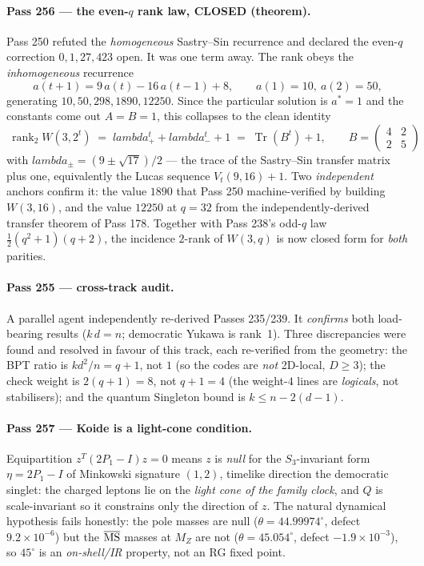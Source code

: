\documentclass[12pt,a4paper]{article}
\def\mathbf#1{#1}%
\def\lambda{lambda}%
\theoremstyle{definition}
\begin{document}
\paragraph{Pass 256 --- the even-$q$ rank law, CLOSED (theorem).} Pass 250
refuted the \emph{homogeneous} Sastry--Sin recurrence and declared the even-$q$
correction $0,1,27,423$ open. It was one term away. The rank obeys the
\emph{inhomogeneous} recurrence
\[
   a(t+1) = 9\,a(t) - 16\,a(t-1) + 8,\qquad a(1)=10,\ a(2)=50,
\]
generating $10,50,298,1890,12250$. Since the particular solution is $a^\ast=1$
and the constants come out $A=B=1$, this collapses to the clean identity
\[
   \boxed{\ \operatorname{rank}_2 W(3,2^t) \;=\; \lambda_+^t+\lambda_-^t+1
   \;=\; \operatorname{Tr}(B^t)+1,\qquad B=\begin{pmatrix}4&2\\2&5\end{pmatrix}\ }
\]
with $\lambda_\pm=(9\pm\sqrt{17})/2$ --- the trace of the Sastry--Sin transfer
matrix plus one, equivalently the Lucas sequence $V_t(9,16)+1$. Two
\emph{independent} anchors confirm it: the value $1890$ that Pass 250
machine-verified by building $W(3,16)$, and the value $12250$ at $q=32$ from the
independently-derived transfer theorem of Pass 178. Together with Pass 238's
odd-$q$ law $\tfrac12(q^2+1)(q+2)$, the incidence $2$-rank of $W(3,q)$ is now
closed form for \emph{both} parities.

\paragraph{Pass 255 --- cross-track audit.} A parallel agent independently
re-derived Passes 235/239. It \emph{confirms} both load-bearing results ($k\,d=n$;
democratic Yukawa is rank~1). Three discrepancies were found and resolved in
favour of this track, each re-verified from the geometry: the BPT ratio is
$k d^2/n=q+1$, not $1$ (so the codes are \emph{not} 2D-local, $D\ge3$); the check
weight is $2(q+1)=8$, not $q+1=4$ (the weight-$4$ lines are \emph{logicals}, not
stabilisers); and the quantum Singleton bound is $k\le n-2(d-1)$.

\paragraph{Pass 257 --- Koide is a light-cone condition.} Equipartition
$z^T(2P_{\mathbf 1}-I)z=0$ means $z$ is \emph{null} for the $S_3$-invariant form
$\eta=2P_{\mathbf 1}-I$ of Minkowski signature $(1,2)$, timelike direction the
democratic singlet: the charged leptons lie on the \emph{light cone of the family
clock}, and $Q$ is scale-invariant so it constrains only the direction of $z$.
The natural dynamical hypothesis fails honestly: the pole masses are null
($\theta=44.99974^\circ$, defect $9.2\times10^{-6}$) but the $\overline{\rm MS}$
masses at $M_Z$ are not ($\theta=45.054^\circ$, defect $-1.9\times10^{-3}$), so
$45^\circ$ is an \emph{on-shell/IR} property, not an RG fixed point.
\end{document}
